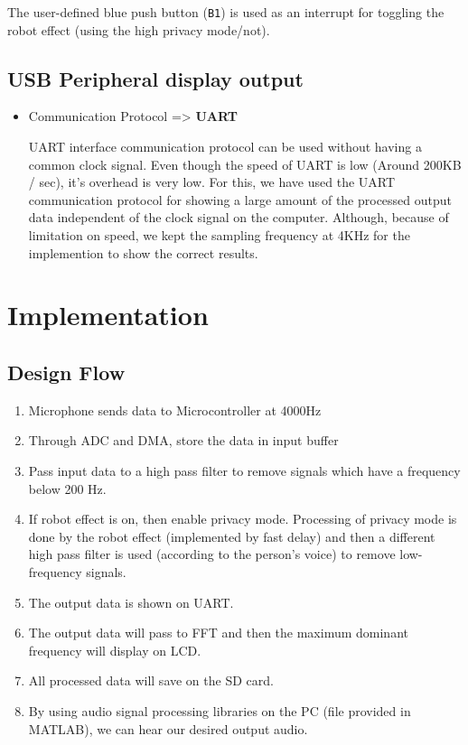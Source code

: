 \documentclass[11pt]{article}
\begin{document}
The user-defined blue push button (\texttt{B1}) is used as an interrupt for toggling the robot effect (using the high privacy mode/not).

\subsection{USB Peripheral display output}
\label{sec:org86e944c}

\begin{itemize}
\item Communication Protocol => \textbf{UART}

UART interface communication protocol can be used without having a common clock signal. Even though the speed of UART is low (Around 200KB / sec), it's overhead is very low. For this, we have used the UART communication protocol for showing a large amount of the processed output data independent of the clock signal on the computer. Although, because of limitation on speed, we kept the sampling frequency at 4KHz for the implemention to show the correct results.
\end{itemize}

\section{Implementation}
\label{sec:orgdd5ac2a}
\subsection{Design Flow}
\label{sec:org9206d30}
\begin{enumerate}
\item Microphone sends data to Microcontroller at 4000Hz
\item Through ADC and DMA, store the data in input buffer
\item Pass input data to a high pass filter to remove signals which have a frequency below 200 Hz.
\item If robot effect is on, then enable privacy mode. Processing of privacy mode is done by the robot effect (implemented by fast delay) and then a different high pass filter is used (according to the person's voice) to remove low-frequency signals.
\item The output data is shown on UART.
\item The output data will pass to FFT and then the maximum dominant frequency will display on LCD.
\item All processed data will save on the SD card.
\item By using audio signal processing libraries on the PC (file provided in MATLAB), we can hear our desired output audio.
\end{enumerate}
\end{document}
